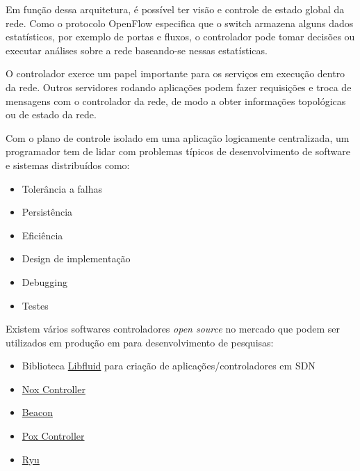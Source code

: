 Em função dessa arquitetura, é possível ter visão e controle de estado global
da rede.
Como o protocolo OpenFlow especifica que o switch armazena alguns dados 
estatísticos, por exemplo de portas e fluxos, o controlador pode tomar 
decisões ou executar análises sobre a rede baseando-se nessas estatísticas.

O controlador exerce um papel importante para os serviços em execução dentro
da rede. 
Outros servidores rodando aplicações podem fazer requisições e troca de 
mensagens com o controlador da rede, de modo a obter informações topológicas
ou de estado da rede.

Com o plano de controle isolado em uma aplicação logicamente centralizada, 
um programador tem de lidar com problemas típicos de desenvolvimento de 
software e sistemas distribuídos como:

\begin{itemize}
    \item Tolerância a falhas
    \item Persistência
    \item Eficiência
    \item Design de implementação
    \item Debugging
    \item Testes
\end{itemize}

Existem vários softwares controladores \emph{open source} no mercado que 
podem ser utilizados em produção em para desenvolvimento de pesquisas:

\begin{itemize}
    \item Biblioteca \href{http://opennetworkingfoundation.github.io/libfluid/index.html}{Libfluid}
        para criação de aplicações/controladores em SDN \citep{libfluid2015}
    \item \href{http://www.noxrepo.org/nox/about-nox/}{Nox Controller}
        \citep{nox2015}
    \item \href{https://openflow.stanford.edu/display/Beacon/Home}{Beacon}
        \citep{beacon2015}
    \item \href{http://www.noxrepo.org/pox/about-pox/}{Pox Controller}
        \citep{pox2015}
    \item \href{http://osrg.github.io/ryu/}{Ryu} \citep{ryu2015}
\end{itemize}


